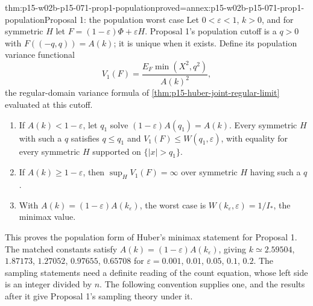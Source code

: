 \begin{hbtheorem}{thm:p15-w02b-p15-071-prop1-population}{proved=annex:p15-w02b-p15-071-prop1-population}{Proposal 1: the population worst case}
Let \(0<\varepsilon<1\), \(k>0\), and for symmetric \(H\) let
\(F=(1-\varepsilon)\Phi+\varepsilon H\). Proposal 1's population
cutoff is a \(q>0\) with \(F((-q,q))=A(k)\); it is unique when it
exists. Define its population variance functional
\[
 V_1(F)=\frac{E_F\min(X^2,q^2)}{A(k)^2},
\]
the regular-domain variance formula of
\cref{thm:p15-huber-joint-regular-limit} evaluated at this cutoff.
\begin{enumerate}
\item If \(A(k)<1-\varepsilon\), let \(q_1\) solve
 \((1-\varepsilon)A(q_1)=A(k)\). Every symmetric \(H\) with such a \(q\)
 satisfies \(q\leq q_1\) and \(V_1(F)\leq W(q_1,\varepsilon)\), with
 equality for every symmetric \(H\) supported on \(\{|x|>q_1\}\).
\item If \(A(k)\geq1-\varepsilon\), then
 \(\sup_HV_1(F)=\infty\) over symmetric \(H\) having such a \(q\).
\item With \(A(k)=(1-\varepsilon)A(k_\varepsilon)\), the worst case is
 \(W(k_\varepsilon,\varepsilon)=1/I_*\), the minimax value.
\end{enumerate}
\end{hbtheorem}

This proves the population form of Huber's minimax statement for
Proposal 1. The matched constants satisfy
\(A(k)=(1-\varepsilon)A(k_\varepsilon)\), giving
\(k\simeq2.59504\), \(1.87173\), \(1.27052\), \(0.97655\), \(0.65708\)
for \(\varepsilon=0.001\), \(0.01\), \(0.05\), \(0.1\), \(0.2\).
The sampling statements need a definite reading of the count equation,
whose left side is an integer divided by \(n\). The following
convention supplies one, and the results after it give Proposal 1's
sampling theory under it.

